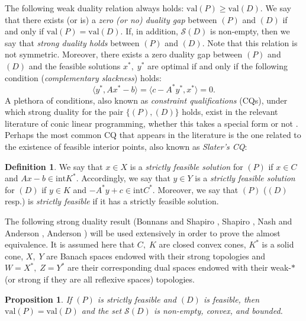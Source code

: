 \documentclass[11pt, twoside]{article}
\numberwithin{equation}{section}
\theoremstyle{definition}
\newtheorem{definition}{Definition}[section]
\newtheorem{proposition}{Proposition}[section]
\begin{document}
 The following weak duality relation always holds: $\text{val}(P)\geq \text{val}(D)$. We say that there exists (or is) a \textit{zero (or no) duality gap} between \hyperlink{primal}{\hyperlink{primal}{$(P)$}} and \hyperlink{dual}{\hyperlink{dual}{$(D)$}} if and only if $\text{val}(P)=\text{val}(D)$. If, in addition, $\mathcal{S}(D)$ is non-empty, then we say that \textit{strong duality holds} between \hyperlink{primal}{$(P)$} and \hyperlink{dual}{$(D)$}. Note that this relation is not symmetric.  Moreover, there exists a zero duality gap between \hyperlink{primal}{\hyperlink{primal}{$(P)$}} and \hyperlink{dual}{\hyperlink{dual}{$(D)$}} and the feasible solutions $x^*,\;y^*$ are optimal if and only if the following condition (\textit{complementary slackness}) holds:
\begin{equation}\label{eq:2.3}
    \langle y^*, Ax^*-b\rangle=\langle c-A^*y^*,x^*\rangle=0.
\end{equation}
A plethora of conditions, also known as \textit{constraint qualifications} (CQs), under which strong duality for the pair \hyperlink{primaldual}{$\{(P),(D)\}$} holds, exist in the relevant literature of conic linear programming, whether this takes a special form  \cite{alizadeh2003second,anderson1989capacity,  dantzig2016linear, karmarkar1984new, lai1992extremal, levinson1966class, nesterov1994interior, shapiro2009semi, weiss2008simplex, wolkowicz2012handbook} or not \cite{anderson1983review, bonnans2013perturbation, khanh2019necessary, kretschmer1961programmes, nash1987linear, shapiro2001duality}. Perhaps the most common CQ that appears in the literature is the one related to the existence of feasible interior points, also known as \textit{Slater's CQ}:
\begin{definition}\label{def:slaters}
    We say that $x\in X$ is a \textit{strictly feasible solution} for \hyperlink{primal}{$(P)$} if $x\in C$ and $Ax-b\in \text{int}K^*$. Accordingly, we say that $y\in Y$ is a \textit{strictly feasible solution} for \hyperlink{dual}{$(D)$} if $y\in K$ and $-A^*y+c\in \text{int}C^*$. Moreover, we say that \hyperlink{primal}{$(P)$} (\hyperlink{dual}{$(D)$} resp.) is \textit{strictly feasible} if it has a strictly feasible solution.
\end{definition}
The following strong duality result (Bonnans and Shapiro \cite[Theorem 2.187]{bonnans2013perturbation}, Shapiro \cite[Proposition 2.8]{shapiro2001duality}, Nash and Anderson \cite[Theorem 3.13]{nash1987linear}, Anderson \cite[Theorem 10]{anderson1983review}) will be used extensively in order to prove the almost equivalence. It is assumed here that $C,\;K$ are closed convex cones, $K^*$ is a solid cone, $X,\;Y$ are Banach spaces endowed with their strong topologies and $W=X^*,\;Z=Y^*$ are their corresponding dual spaces endowed with their weak-$*$ (or strong if they are all reflexive spaces) topologies.\quad\vspace{0.2cm}
\begin{proposition}\label{prop:2.1}
    \textit{If \hyperlink{primal}{$(P)$} is strictly feasible and \hyperlink{dual}{$(D)$} is feasible, then $\text{val}(P)=\text{val}(D)$ and the set $\mathcal{S}(D)$ is non-empty, convex, and bounded.}
\end{proposition}
\end{document}
